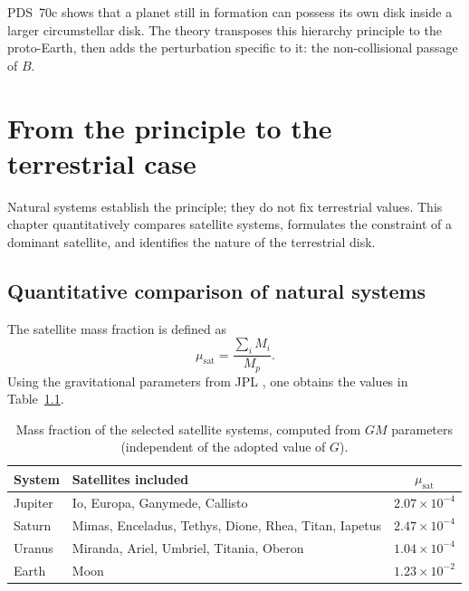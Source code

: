 \documentclass[11pt,a4paper,openany]{report}
\begin{document}
\begin{ideephys}
PDS~70c shows that a planet still in formation can possess its own disk inside a larger
circumstellar disk. The theory transposes this hierarchy principle to the proto-Earth, then adds
the perturbation specific to it: the non-collisional passage of $B$.
\end{ideephys}

\chapter{From the principle to the terrestrial case}
\label{ch:cas-terrestre}

Natural systems establish the principle; they do not fix terrestrial values. This chapter
quantitatively compares satellite systems, formulates the constraint of a dominant satellite, and
identifies the nature of the terrestrial disk.

\section{Quantitative comparison of natural systems}

The satellite mass fraction is defined as
\begin{equation}
\mu_{\mathrm{sat}}=\frac{\sum_i M_i}{M_p}.
\label{eq:musat}
\end{equation}
Using the gravitational parameters from JPL \cite{JPL}, one obtains the values in
Table~\ref{tab:musat}.

\begin{table}[htbp]
\centering
\caption{Mass fraction of the selected satellite systems, computed from $GM$ parameters
(independent of the adopted value of $G$).}
\label{tab:musat}
\begin{tabular}{llc}
\toprule
\textbf{System} & \textbf{Satellites included} & $\mu_{\mathrm{sat}}$ \\
\midrule
Jupiter & Io, Europa, Ganymede, Callisto & $2.07\times10^{-4}$ \\
Saturn & Mimas, Enceladus, Tethys, Dione, Rhea, Titan, Iapetus & $2.47\times10^{-4}$ \\
Uranus  & Miranda, Ariel, Umbriel, Titania, Oberon & $1.04\times10^{-4}$ \\
Earth   & Moon & $1.23\times10^{-2}$ \\
\bottomrule
\end{tabular}
\end{table}
\end{document}
